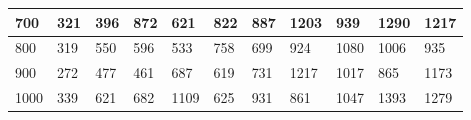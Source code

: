 \documentclass[10pt,letterpaper]{article}
\begin{document}
\begin{center}
\begin{table}
\begin{tabular} { |m{0.5cm}|m{1.3cm}|m{1.3cm}|m{1.3cm}|m{1.3cm}|m{1.3cm}|m{1.3cm}|m{1.3cm}|m{1.3cm}|m{1.3cm}|m{1.3cm}|}
\hline
\cellcolor{Gray}700 & \Large 321 & \Large 396 & \Large 872 & \Large 621 & \Large 822 & \Large 887 & \Large 1203 & \Large 939 & \Large 1290 & \Large 1217 \\
\hline
\cellcolor{Gray}800 & \Large 319 & \Large 550 & \Large 596 & \Large 533 & \Large 758 & \Large 699 & \Large 924 & \Large 1080 & \Large 1006 & \Large 935 \\
\hline
\cellcolor{Gray}900 & \Large 272 & \Large 477 & \Large 461 & \Large 687 & \Large 619 & \Large 731 & \Large 1217 & \Large 1017 & \Large 865 & \Large 1173 \\
\hline
\cellcolor{Gray}1000 & \Large 339 & \Large 621 & \Large 682 & \Large 1109 & \Large 625 & \Large 931 & \Large 861 & \Large 1047 & \Large 1393 & \Large 1279 \\
\hline
\end{tabular} \\
\end{table}
\end{center}
\newpage 
{}
\end{document}
